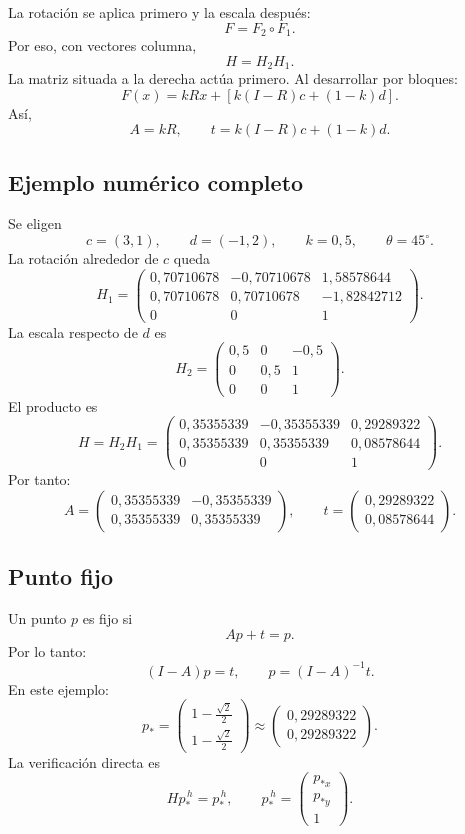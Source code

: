 La rotación se aplica primero y la escala después:
\[
F=F_2\circ F_1.
\]
Por eso, con vectores columna,
\[
\boxed{H=H_2H_1}.
\]
La matriz situada a la derecha actúa primero. Al desarrollar por bloques:
\[
F(x)=kRx+\left[k(I-R)c+(1-k)d\right].
\]
Así,
\[
A=kR,
\qquad
t=k(I-R)c+(1-k)d.
\]

\subsection{Ejemplo numérico completo}

Se eligen
\[
c=(3,1),\qquad d=(-1,2),\qquad
k=0{,}5,\qquad \theta=45^\circ.
\]
La rotación alrededor de \(c\) queda
\[
H_1=
\begin{pmatrix}
0{,}70710678&-0{,}70710678&1{,}58578644\\
0{,}70710678& 0{,}70710678&-1{,}82842712\\
0&0&1
\end{pmatrix}.
\]
La escala respecto de \(d\) es
\[
H_2=
\begin{pmatrix}
0{,}5&0&-0{,}5\\
0&0{,}5&1\\
0&0&1
\end{pmatrix}.
\]
El producto es
\[
\boxed{
H=H_2H_1=
\begin{pmatrix}
0{,}35355339&-0{,}35355339&0{,}29289322\\
0{,}35355339& 0{,}35355339&0{,}08578644\\
0&0&1
\end{pmatrix}
}.
\]
Por tanto:
\[
A=
\begin{pmatrix}
0{,}35355339&-0{,}35355339\\
0{,}35355339& 0{,}35355339
\end{pmatrix},
\qquad
t=
\begin{pmatrix}
0{,}29289322\\
0{,}08578644
\end{pmatrix}.
\]

\subsection{Punto fijo}

Un punto \(p\) es fijo si
\[
Ap+t=p.
\]
Por lo tanto:
\[
(I-A)p=t,
\qquad
\boxed{p=(I-A)^{-1}t}.
\]
En este ejemplo:
\[
\boxed{
p_\ast=
\begin{pmatrix}
1-\frac{\sqrt2}{2}\\[1mm]
1-\frac{\sqrt2}{2}
\end{pmatrix}
\approx
\begin{pmatrix}
0{,}29289322\\
0{,}29289322
\end{pmatrix}
}.
\]
La verificación directa es
\[
Hp_\ast^{\,h}=p_\ast^{\,h},
\qquad
p_\ast^{\,h}=
\begin{pmatrix}p_{\ast x}\\p_{\ast y}\\1\end{pmatrix}.
\]

